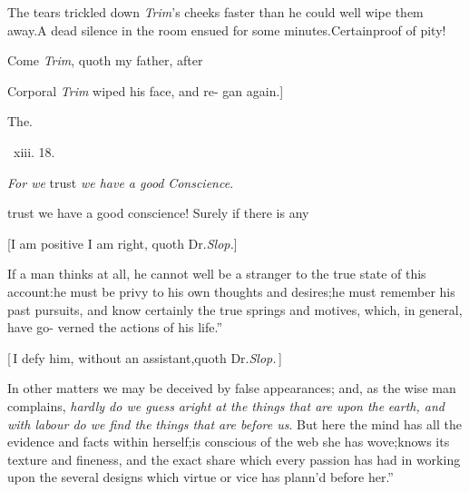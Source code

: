\documentclass{article}
\begin{document}
\tsh The tears trickled down \textit{Trim}’s cheeks faster
than he could well wipe them away.\tsk A dead silence in the room
ensued for some minutes.\tsh Certain\break proof of pity!

Come \textit{Trim}, quoth my father, after\break
{} 

Corporal \textit{Trim} wiped his face, and re-\break
{} 
gan again.]

\bigskip
\centerline{The\quad {}.}
\bigskip
\centerline{\textsc{}\, xiii. 18.}
\tsh \textit{For we} trust \textit{we have a good}\break
\textit{Conscience}.\tsh

trust we have a good conscience! Surely if there is any\break
{}

[I am positive I am right, quoth Dr.\@ \textit{Slop.}]

\lqq If a man thinks at all, he cannot\break
\lqq well be a stranger to the true state of\break
\lqq this account:\tsk he must be privy to\break
\lqq his own thoughts and desires;\tsh he\break
\lqq must remember his past pursuits, and\break
\lqq know certainly the true springs and\break
\lqq motives, which, in general, have go-\break
\lqq verned the actions of his life.”

[\,I defy him, without an assistant,\break quoth Dr.\@ \textit{Slop.}\,]

\indent\lqq In other matters we may be deceived\break
\lqq by false appearances; and, as the wise\break
\lqq man complains, \textit{hardly do we guess}\break
\lqq\textit{aright at the things that are upon the}\break
\lqq\textit{earth, and with labour do we find the}\break
\lqq\textit{things that are before us}. But here the\break
\lqq mind has all the evidence and facts\break
\lqq within herself;\tsk is conscious of the web\break
\lqq she has wove;\tsk knows its texture and
\lqq fineness, and the exact share which\break
\lqq every passion has had in working upon\break
\lqq the several designs which virtue or vice\break
\lqq has plann’d before her.”
\end{document}
